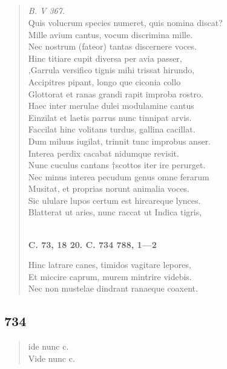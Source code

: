 \documentclass[11pt, a4paper]{report}
\begin{document}
            \subsection*{}
      \begin{verse}
      \textit{B. V 367.} \\ Quis volucrum species numeret, quis nomina discat? \\ Mille avium cantus, vocum discrimina mille. \\ Nec nostrum (fateor) tantas discernere voces. \\ Hinc titiare cupit diversa per avia passer, \\ ,Garrula versifico tignis mihi trissat hirundo, \\  \lbrack Accipitres pipant, longo \lbrack que \rbrack  ciconia collo \\ Glottorat et ranas grandi rapit improba rostro. \\ Haec inter merulae dulei modulamine cantus \\ Einzilat et laetis parrus nunc tinnipat arvis. \\ Faccilat hinc volitans turdus, gallina cacillat. \\ Dum miluus iugilat, trinnit tunc improbus anser. \\ Interea perdix cacabat nidumque revisit. \\ Nunc cuculus cantans †scottos iter ire perurget. \\ Nec minus interea pecudum genus omne ferarum \\ Musitat, et proprias norunt animalia voces. \\ Sic ululare lupos certum est hircareque lynces. \\ Blatterat ut aries, nunc raccat ut Indica tigris, \\ 
        ﻿\pagebreak 
    \begin{center} \textbf{C. 73, 18 20. C. 734 788, 1—2} \end{center} \marginpar{[219]} Hinc latrare canes, timidos vagitare lepores, \\ Et miccire caprum, murem mintrire videbis. \\ Nec non mustelae dindrant ranaeque coaxent. \\ 
      \end{verse}
  
            \subsection*{734}
      \begin{verse}
      ide nunc c. \\ Vide nunc c. \\ 
      \end{verse}
  
\end{document}
